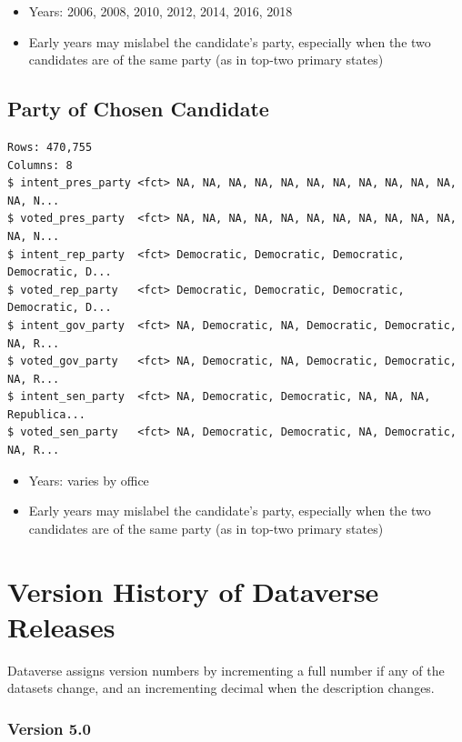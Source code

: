 \documentclass[10pt,article,oneside]{memoir}
\theoremstyle{definition}
\begin{document}
\begin{itemize}
\tightlist
\item
  Years: 2006, 2008, 2010, 2012, 2014, 2016, 2018
\item
  Early years may mislabel the candidate's party, especially when the
  two candidates are of the same party (as in top-two primary states)
\end{itemize}

\hypertarget{party-of-chosen-candidate}{%
\subsection{Party of Chosen Candidate}\label{party-of-chosen-candidate}}

\begin{verbatim}
Rows: 470,755
Columns: 8
$ intent_pres_party <fct> NA, NA, NA, NA, NA, NA, NA, NA, NA, NA, NA, NA, N...
$ voted_pres_party  <fct> NA, NA, NA, NA, NA, NA, NA, NA, NA, NA, NA, NA, N...
$ intent_rep_party  <fct> Democratic, Democratic, Democratic, Democratic, D...
$ voted_rep_party   <fct> Democratic, Democratic, Democratic, Democratic, D...
$ intent_gov_party  <fct> NA, Democratic, NA, Democratic, Democratic, NA, R...
$ voted_gov_party   <fct> NA, Democratic, NA, Democratic, Democratic, NA, R...
$ intent_sen_party  <fct> NA, Democratic, Democratic, NA, NA, NA, Republica...
$ voted_sen_party   <fct> NA, Democratic, Democratic, NA, Democratic, NA, R...
\end{verbatim}

\begin{itemize}
\tightlist
\item
  Years: varies by office
\item
  Early years may mislabel the candidate's party, especially when the
  two candidates are of the same party (as in top-two primary states)
\end{itemize}

\newpage

\hypertarget{version-history-of-dataverse-releases}{%
\section{Version History of Dataverse
Releases}\label{version-history-of-dataverse-releases}}

Dataverse assigns version numbers by incrementing a full number if any
of the datasets change, and an incrementing decimal when the description
changes.

\hypertarget{version-5.0}{%
\subsubsection{Version 5.0}\label{version-5.0}}
\end{document}
